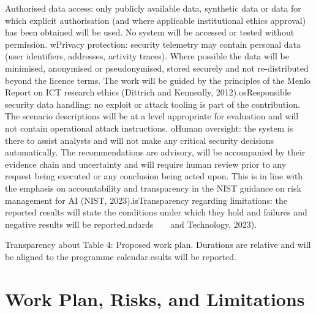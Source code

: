 \documentclass[a4paper,11pt]{article}
\begin{document}
Authorised data access: only publicly available data, synthetic data or data for which explicit authorisation (and where applicable institutional ethics approval) has been obtained will be used. No system will be accessed or tested without permission. wPrivacy protection: security telemetry may contain personal data (user identifiers, addresses, activity traces). Where possible the data will be minimised, anonymised or pseudonymised, stored securely and not re-distributed beyond the licence terms. The work will be guided by the principles of the Menlo Report on ICT research ethics (Dittrich and Kenneally, 2012).osResponsible security data handling: no exploit or attack tooling is part of the contribution. The scenario descriptions will be at a level appropriate for evaluation and will not contain operational attack instructions. oHuman oversight: the system is there to assist analysts and will not make any critical security decisions automatically. The recommendations are advisory, will be accompanied by their evidence chain and uncertainty and will require human review prior to any request being executed or any conclusion being acted upon. This is in line with the emphasis on accountability and transparency in the NIST guidance on risk management for AI (NIST, 2023).isTransparency regarding limitations: the reported results will state the conditions under which they hold and failures and negative results will be reported.ndards     and Technology, 2023).\par
Transparency about Table 4: Proposed work plan. Durations are relative and will be aligned to the programme calendar.esults will be reported.\par
\section{Work Plan, Risks, and Limitations}
\end{document}
